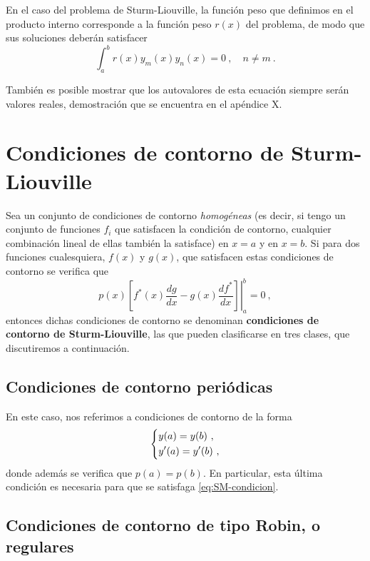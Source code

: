 En el caso del problema de Sturm-Liouville, la función peso que definimos en el producto interno corresponde a la función peso $r(x)$ del problema, de modo que sus soluciones deberán satisfacer
\begin{equation}
    \int_a^b r(x) y_m(x) y_n(x) = 0 \ , \quad n \neq m \ .
\end{equation}

También es posible mostrar que los autovalores de esta ecuación siempre serán valores reales, demostración que se encuentra en el apéndice X.

\section{Condiciones de contorno de Sturm-Liouville}

Sea un conjunto de condiciones de contorno \emph{homogéneas} (es decir, si tengo un conjunto de funciones $f_i$ que satisfacen la condición de contorno, cualquier combinación lineal de ellas también la satisface) en $x=a$ y en $x=b$. Si para dos funciones cualesquiera, $f(x)$ y $g(x)$, que satisfacen estas condiciones de contorno se verifica que
\begin{equation} \label{eq:SM-condicion}
    p(x)  \left.  \left[ f^\ast(x) \frac{dg}{dx} - g(x)\frac{df^\ast}{dx} \right]\right|_a^b = 0 \ ,
\end{equation}
entonces dichas condiciones de contorno se denominan \textbf{condiciones de contorno de Sturm-Liouville}, las que pueden clasificarse en tres clases, que discutiremos a continuación.

\subsection{Condiciones de contorno periódicas}

En este caso, nos referimos a condiciones de contorno de la forma
\begin{equation}
    \begin{dcases}
        y(a) = y(b) \ , \\
        y'(a) = y'(b) \ ,
    \end{dcases}
\end{equation}
donde además se verifica que $p(a) = p(b)$. En particular, esta última condición es necesaria para que se satisfaga \eqref{eq:SM-condicion}.

\subsection{Condiciones de contorno de tipo Robin, o regulares}


